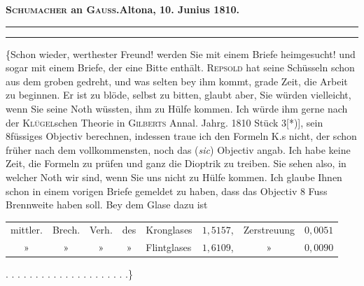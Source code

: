 \clearpage\begingroup
{}\NoSourceHead
\begin{center}
\textbf{\Large{}}\par\bigskip
[1.]\par\medskip
\textbf{\textsc{Schumacher} an \textsc{Gauss}.\quad Altona, 10. Junius 1810.}\par\medskip
\rule{.75\linewidth}{.4pt}\par
[Briefwechsel zwischen \textsc{Gauss} und \textsc{Schumacher} I, S. 43.]\par
\rule{.75\linewidth}{.4pt}
\end{center}
\noindent\hspace*{\parindent}\{Schon wieder, werthester Freund! werden Sie mit einem Briefe heimgesucht! und sogar mit einem Briefe, der eine Bitte enthält. \textsc{Repsold} hat seine Schüsseln schon aus dem groben gedreht, und was selten bey ihm kommt, grade Zeit, die Arbeit zu beginnen. Er ist zu blöde, selbst zu bitten, glaubt aber, Sie würden vielleicht, wenn Sie seine Noth wüssten, ihm zu Hülfe kommen. Ich würde ihm gerne nach der \textsc{Klügel}schen Theorie in \textsc{Gilberts} Annal. Jahrg. 1810 Stück 3[*)], sein 8füssiges Objectiv berechnen, indessen traue ich den Formeln K.s nicht, der schon früher nach dem vollkommensten, noch das  (\textit{sic}) Objectiv angab. Ich habe keine Zeit, die Formeln zu prüfen und ganz die Dioptrik zu treiben. Sie sehen also, in welcher Noth wir sind, wenn Sie uns nicht zu Hülfe kommen. Ich glaube Ihnen schon in einem vorigen Briefe gemeldet zu haben, dass das Objectiv 8 Fuss Brennweite haben soll. Bey dem Glase dazu ist
\begingroup\renewcommand{\thefootnote}{}\endgroup
\begin{center}
\begingroup\small\setlength{\tabcolsep}{3pt}
\begin{tabular}{cccc l r c r}
mittler.&Brech.&Verh.&des&Kronglases&$1{,}5157$,&Zerstreuung&$0{,}0051$\\
»&»&»&»&Flintglases&$1{,}6109$,&»&$0{,}0090$
\end{tabular}\endgroup
\end{center}
\noindent . . . . . . . . . . . . . . . . . . . . .\}
\clearpage\endgroup
